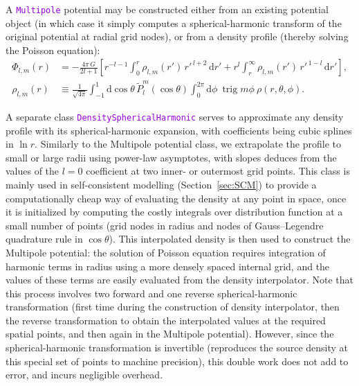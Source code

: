 \documentclass[12pt]{article}
\newcommand{\ttt}[1]{\textcolor{darkviolet}{\texttt{#1}}}
\renewcommand{\d}{\mathrm{d}}
\DeclareMathOperator{\trig}{trig}
\begin{document}
A \ttt{Multipole} potential may be constructed either from an existing potential object (in which case it simply computes a spherical-harmonic transform of the original potential at radial grid nodes), or from a density profile (thereby solving the Poisson equation):
\begin{align}
\Phi_{l,m}(r) &= -\frac{4\pi\,G}{2l+1} \left[ r^{-l-1} \int_0^r \rho_{l,m}(r')\,{r'}^{\,l+2}\,\d r' + r^l\int_r^\infty \rho_{l,m}(r')\,{r'}^{\,1-l}\,\d r' \right],  \label{eq:SphHarmPoisson} \\
\rho_{l,m}(r) &\equiv \frac{1}{\sqrt{4\pi}} \int_{-1}^1 \d \cos\theta\, \tilde P_l^m(\cos\theta) \int_0^{2\pi}\d \phi\:\trig m\phi\:\rho(r,\theta,\phi) .  \label{eq:SphHarmDensity}
\end{align}

A separate class \ttt{DensitySphericalHarmonic} serves to approximate any density profile with its spherical-harmonic expansion, with coefficients being cubic splines in $\ln r$. 
Similarly to the Multipole potential class, we extrapolate the profile to small or large radii using power-law asymptotes, with slopes deduces from the values of the $l=0$ coefficient at two inner- or outermost grid points. This class is mainly used in self-consistent modelling (Section~\ref{sec:SCM}) to provide a computationally cheap way of evaluating the density at any point in space, once it is initialized by computing the costly integrals over distribution function at a small number of points (grid nodes in radius and nodes of Gauss--Legendre quadrature rule in $\cos\theta$). This interpolated density is then used to construct the Multipole potential: the solution of Poisson equation requires integration of harmonic terms in radius using a more densely spaced internal grid, and the values of these terms are easily evaluated from the density interpolator. Note that this process involves two forward and one reverse spherical-harmonic transformation (first time during the construction of density interpolator, then the reverse transformation to obtain the interpolated values at the required spatial points, and then again in the Multipole potential). However, since the spherical-harmonic transformation is invertible (reproduces the source density at this special set of points to machine precision), this double work does not add to error, and incurs negligible overhead.
\end{document}
